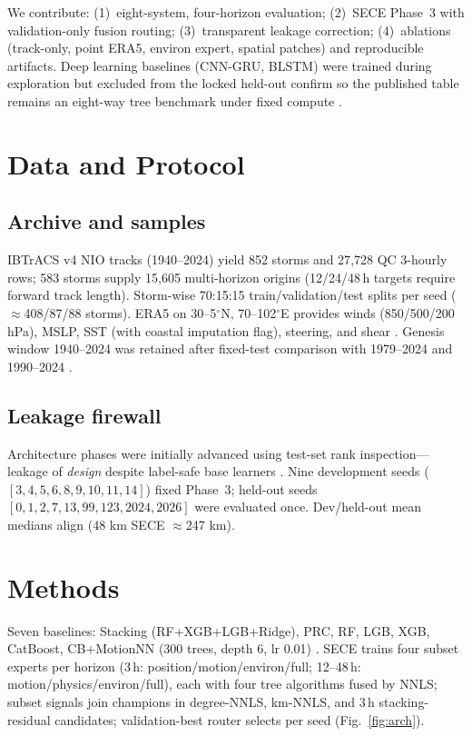 \documentclass[conference]{IEEEtran}
\newcommand{\sece}{SECE}
\newcommand{\era}{ERA5}
\newcommand{\ibtracs}{IBTrACS}
\newcommand{\km}{\,km}
\begin{document}
We contribute: (1)~eight-system, four-horizon evaluation; (2)~\sece{} Phase~3 with validation-only fusion routing; (3)~transparent leakage correction; (4)~ablations (track-only, point \era{}, environ expert, spatial patches) and reproducible artifacts.
Deep learning baselines (CNN-GRU, BLSTM) were trained during exploration but excluded from the locked held-out confirm so the published table remains an eight-way tree benchmark under fixed compute \cite{liu2020,chen2020,reichstein2019}.

\section{Data and Protocol}
\subsection{Archive and samples}
\ibtracs{} v4 NIO tracks (1940--2024) yield 852 storms and 27{,}728 QC 3-hourly rows; 583 storms supply 15{,}605 multi-horizon origins (12/24/48\,h targets require forward track length).
Storm-wise 70:15:15 train/validation/test splits per seed ($\approx$408/87/88 storms).
\era{} on 30--5$^\circ$N, 70--102$^\circ$E provides winds (850/500/200\,hPa), MSLP, SST (with coastal imputation flag), steering, and shear \cite{barnes2013,holland1983}.
Genesis window 1940--2024 was retained after fixed-test comparison with 1979--2024 and 1990--2024 \cite{walsh2015,kossin2013}.

\subsection{Leakage firewall}
Architecture phases were initially advanced using test-set rank inspection---leakage of \emph{design} despite label-safe base learners \cite{cawley2010}.
Nine development seeds ($[3,4,5,6,8,9,10,11,14]$) fixed Phase~3; held-out seeds $[0,1,2,7,13,99,123,2024,2026]$ were evaluated once.
Dev/held-out mean medians align (48\,\km{} \sece{} $\approx$247\,\km{}).

\section{Methods}
Seven baselines: Stacking (RF+XGB+LGB+Ridge), PRC, RF, LGB, XGB, CatBoost, CB+MotionNN (300 trees, depth 6, lr 0.01) \cite{probst2019}.
\sece{} trains four subset experts per horizon (3\,h: position/motion/environ/full; 12--48\,h: motion/physics/environ/full), each with four tree algorithms fused by NNLS; subset signals join champions in degree-NNLS, km-NNLS, and 3\,h stacking-residual candidates; validation-best router selects per seed (Fig.~\ref{fig:arch}).
\end{document}
